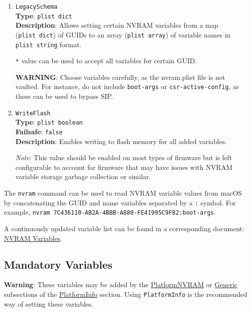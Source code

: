 \documentclass[]{article}
\begin{document}
\begin{enumerate}
  \emph{Note}: Only variables accessible from the operating system will be overwritten.

\item
  \texttt{LegacySchema}\\
  \textbf{Type}: \texttt{plist\ dict}\\
  \textbf{Description}: Allows setting certain NVRAM variables from a map
  (\texttt{plist\ dict}) of GUIDs to an array (\texttt{plist\ array}) of
  variable names in \texttt{plist\ string} format.

  \texttt{*} value can be used to accept all variables for certain GUID.

  \textbf{WARNING}: Choose variables carefully, as the nvram.plist file is not vaulted.
  For instance, do not include \texttt{boot-args} or \texttt{csr-active-config}, as
  these can be used to bypass SIP.

\item
  \texttt{WriteFlash}\\
  \textbf{Type}: \texttt{plist\ boolean}\\
  \textbf{Failsafe}: \texttt{false}\\
  \textbf{Description}: Enables writing to flash memory for all added variables.

  \emph{Note}: This value should be enabled on most types of firmware but is
  left configurable to account for firmware that may have issues with NVRAM
  variable storage garbage collection or similar.

\end{enumerate}

The \texttt{nvram} command can be used to read NVRAM variable values from macOS
by concatenating the GUID and name variables separated by a \texttt{:} symbol.
For example, \texttt{nvram 7C436110-AB2A-4BBB-A880-FE41995C9F82:boot-args}.

A continuously updated variable list can be found in a corresponding document:
\href{https://docs.google.com/spreadsheets/d/1HTCBwfOBkXsHiK7os3b2CUc6k68axdJYdGl-TyXqLu0}{NVRAM Variables}.

\subsection{Mandatory Variables}\label{nvramvars}

\textbf{Warning}: These variables may be added by the
\hyperref[platforminfonvram]{PlatformNVRAM} or
\hyperref[platforminfogeneric]{Generic} subsections of the
\hyperref[platforminfo]{PlatformInfo} section.
Using \texttt{PlatformInfo} is the recommended way of setting these variables.
\end{document}
